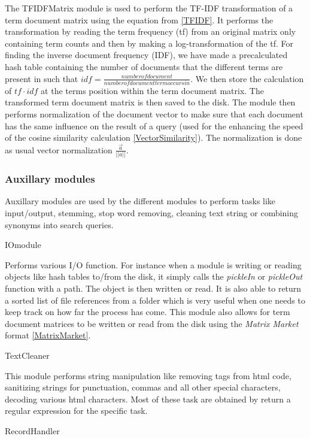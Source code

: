 The TFIDFMatrix module is used to perform the TF-IDF transformation of
a term document matrix using the equation from \ref{TFIDF}. It
performs the transformation by reading the term frequency (tf) from an
original matrix only containing term counts and then by making a
log-transformation of the tf. For finding the inverse document
frequency (IDF), we have made a precalculated hash table containing
the number of documents that the different terms are present in such
that $idf = \frac{number of document}{number of document term occurs
  in}$. We then store the calculation of $tf \cdot idf$ at the terms
position within the term document matrix. The transformed term
document matrix is then saved to the disk. The module then performs
normalization of the document vector to make sure that each document
has the same influence on the result of a query (used for the
enhancing the speed of the cosine similarity calculation
\ref{VectorSimilarity}). The normalization is done as usual vector
normalization $\frac{\overrightarrow{a}}{||a||}$.

\subsubsection{Auxillary modules\label{AuxModules}}

Auxillary modules are used by the different modules to perform tasks
like input/output, stemming, stop word removing, cleaning text string
or combining synonyms into search queries.

IOmodule

Performs various I/O function. For instance when a module is writing
or reading objects like hash tables to/from the disk, it simply calls
the \textit{pickleIn} or \textit{pickleOut} function with a path. The
object is then written or read. It is also able to return a sorted
list of file references from a folder which is very useful when one
needs to keep track on how far the process has come. This module also
allows for term document matrices to be written or read from the disk
using the \textit{Matrix Market} format \ref{MatrixMarket}.

TextCleaner

This module performs string manipulation like removing tags from html
code, sanitizing strings for punctuation, commas and all other special
characters, decoding various html characters. Most of these task are
obtained by return a regular expression for the specific task.

RecordHandler

